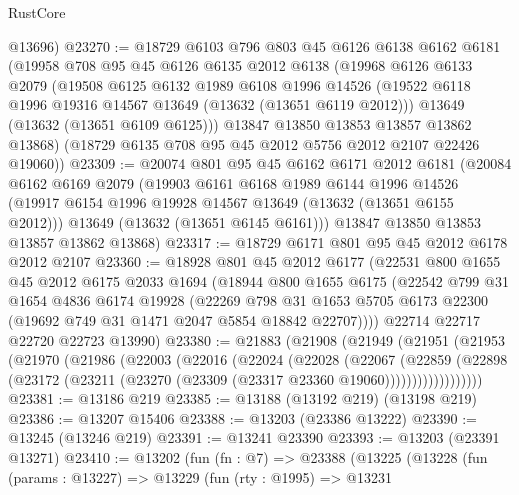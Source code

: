 \begin{lexlean}{RustCore}
\begin{coremodule}
      @13696)
@23270 := @18729
    @6103
    @796
    @803
    @45
    @6126
    @6138
    @6162
    @6181
    (@19958
      @708
      @95
      @45
      @6126
      @6135
      @2012
      @6138
      (@19968
        @6126
        @6133
        @2079
        (@19508
          @6125
          @6132
          @1989
          @6108
          @1996
          @14526
          (@19522 @6118 @1996 @19316 @14567 @13649 (@13632 (@13651 @6119 @2012)))
          @13649
          (@13632 (@13651 @6109 @6125)))
        @13847
        @13850
        @13853
        @13857
        @13862
        @13868)
      (@18729 @6135 @708 @95 @45 @2012 @5756 @2012 @2107 @22426 @19060))
@23309 := @20074
    @801
    @95
    @45
    @6162
    @6171
    @2012
    @6181
    (@20084
      @6162
      @6169
      @2079
      (@19903
        @6161
        @6168
        @1989
        @6144
        @1996
        @14526
        (@19917 @6154 @1996 @19928 @14567 @13649 (@13632 (@13651 @6155 @2012)))
        @13649
        (@13632 (@13651 @6145 @6161)))
      @13847
      @13850
      @13853
      @13857
      @13862
      @13868)
@23317 := @18729 @6171 @801 @95 @45 @2012 @6178 @2012 @2107
@23360 := @18928
    @801
    @45
    @2012
    @6177
    (@22531
      @800
      @1655
      @45
      @2012
      @6175
      @2033
      @1694
      (@18944
        @800
        @1655
        @6175
        (@22542
          @799
          @31
          @1654
          @4836
          @6174
          @19928
          (@22269
            @798
            @31
            @1653
            @5705
            @6173
            @22300
            (@19692 @749 @31 @1471 @2047 @5854 @18842 @22707))))
      @22714
      @22717
      @22720
      @22723
      @13990)
@23380 := @21883
    (@21908
      (@21949
        (@21951
          (@21953
            (@21970
              (@21986
                (@22003
                  (@22016
                    (@22024
                      (@22028
                        (@22067
                          (@22859
                            (@22898
                              (@23172
                                (@23211 (@23270 (@23309 (@23317 @23360 @19060))))))))))))))))))
@23381 := @13186 @219
@23385 := @13188 (@13192 @219) (@13198 @219)
@23386 := @13207 @15406
@23388 := @13203 (@23386 @13222)
@23390 := @13245 (@13246 @219)
@23391 := @13241 @23390
@23393 := @13203 (@23391 @13271)
@23410 := @13202
    (fun (fn : @7) =>
    @23388
      (@13225
        (@13228
          (fun (params : @13227) =>
          @13229
            (fun (rty : @1995) =>
            @13231

\end{coremodule}
\end{lexlean}
